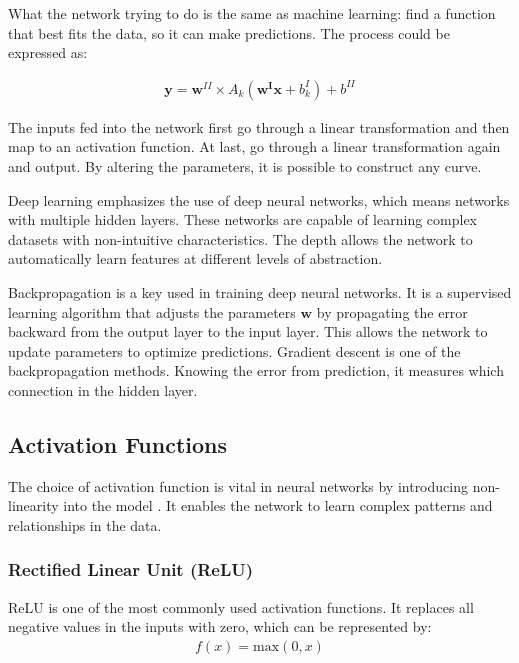What the network trying to do is the same as machine learning: find a function that best fits the data, so it can make predictions. The process could be expressed as:

\begin{gather}
    \mathbf{y} =\mathbf{w}^{II} \times A_k (\mathbf{w^Ix} + b^I_k)+ b^{II}
\end{gather}

The inputs fed into the network first go through a linear transformation and then map to an activation function. At last, go through a linear transformation again and output. 
By altering the parameters, it is possible to construct any curve. 

Deep learning emphasizes the use of deep neural networks, which means networks with multiple hidden layers. These networks are capable of learning complex datasets with non-intuitive 
characteristics. The depth allows the network to automatically learn features at different levels of abstraction.

Backpropagation is a key used in training deep neural networks. It is a supervised learning algorithm that adjusts the parameters $\mathbf{w}$
by propagating the error backward from the output layer to the input layer. This allows the network to update parameters to optimize predictions. 
Gradient descent is one of the backpropagation methods. Knowing the error from prediction, it measures which connection in the hidden layer.

\subsection{Activation Functions} \label{Section:activation}

The choice of activation function is vital in neural networks by introducing non-linearity into the model \cite{activation}. 
It enables the network to learn complex patterns and relationships in the data. 

\subsubsection{Rectified Linear Unit (ReLU)}

ReLU is one of the most commonly used activation functions. It replaces all negative values in the inputs with zero, which can be represented by: 
\begin{gather}
    f(x) = \mathrm{max}(0, x) 
\end{gather}

